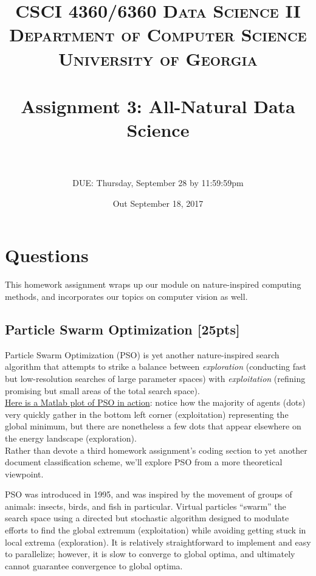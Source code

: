 \documentclass[paper=a4, fontsize=11pt]{scrartcl} %
\title{	
\normalfont \normalsize 
\textsc{CSCI 4360/6360 Data Science II} \\
\textsc{Department of Computer Science} \\
\textsc{University of Georgia} \\ [15pt] %
\horrule{0.5pt} \\[0.3cm] %
\huge Assignment 3: All-Natural Data Science \\ %
\horrule{2pt} \\[0.4cm] %
}
\author{DUE: Thursday, September 28 by 11:59:59pm} %
\date{\normalsize Out September 18, 2017}
\numberwithin{figure}{section} %
\numberwithin{table}{section} %
\begin{document}
\maketitle %


\section*{Questions}

This homework assignment wraps up our module on nature-inspired computing methods, and incorporates our topics on computer vision as well.

\setcounter{subsection}{0}

\subsection{Particle Swarm Optimization \textbf{[25pts]}}

Particle Swarm Optimization (PSO) is yet another nature-inspired search algorithm that attempts to strike a balance between \emph{exploration} (conducting fast but low-resolution searches of large parameter spaces) with \emph{exploitation} (refining promising but small areas of the total search space). \\

\href{https://www.youtube.com/watch?v=lX5qJimYusQ}{Here is a Matlab plot of PSO in action}: notice how the majority of agents (dots) very quickly gather in the bottom left corner (exploitation) representing the global minimum, but there are nonetheless a few dots that appear elsewhere on the energy landscape (exploration). \\

Rather than devote a third homework assignment's coding section to yet another document classification scheme, we'll explore PSO from a more theoretical viewpoint. 

PSO was introduced in 1995, and was inspired by the movement of groups of animals: insects, birds, and fish in particular. Virtual particles ``swarm'' the search space using a directed but stochastic algorithm designed to modulate efforts to find the global extremum (exploitation) while avoiding getting stuck in local extrema (exploration). It is relatively straightforward to implement and easy to parallelize; however, it is slow to converge to global optima, and ultimately cannot guarantee convergence to global optima. \\
\end{document}
